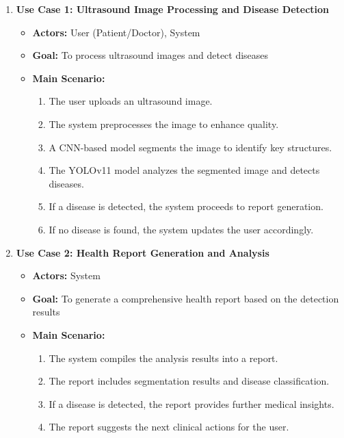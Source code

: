 \documentclass[12pt]{article}
\numberwithin{figure}{subsection}
\begin{document}
\begin{enumerate}
    \item \textbf{Use Case 1: Ultrasound Image Processing and Disease Detection}  
    \begin{itemize}
        \item \textbf{Actors:} User (Patient/Doctor), System  
        \item \textbf{Goal:} To process ultrasound images and detect diseases  
        \item \textbf{Main Scenario:}
        \begin{enumerate}
            \item The user uploads an ultrasound image.  
            \item The system preprocesses the image to enhance quality.  
            \item A CNN-based model segments the image to identify key structures.  
            \item The YOLOv11 model analyzes the segmented image and detects diseases.  
            \item If a disease is detected, the system proceeds to report generation.  
            \item If no disease is found, the system updates the user accordingly.  
        \end{enumerate}
    \end{itemize}

    \item \textbf{Use Case 2: Health Report Generation and Analysis}  
    \begin{itemize}
        \item \textbf{Actors:} System  
        \item \textbf{Goal:} To generate a comprehensive health report based on the detection results  
        \item \textbf{Main Scenario:}
        \begin{enumerate}
            \item The system compiles the analysis results into a report.  
            \item The report includes segmentation results and disease classification.  
            \item If a disease is detected, the report provides further medical insights.  
            \item The report suggests the next clinical actions for the user.  
        \end{enumerate}
    \end{itemize}


\end{enumerate}
\end{document}
